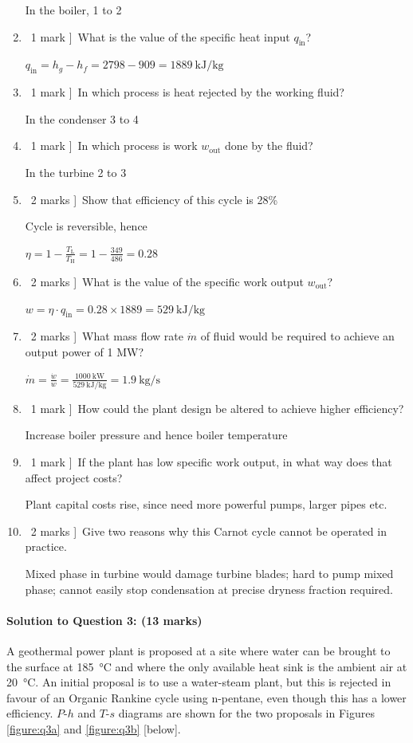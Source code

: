 \documentclass[a4paper,12pt,fleqn]{article}
\begin{document}
\begin{enumerate}[label=\alph*)]
In the boiler, 1 to 2
\item \lbrack\ 1 mark ]\ What is the value of the specific heat input $q_\mathrm{in}$?\par
$q_\mathrm{in}=h_g-h_f = 2798 - 909 = \SI{1889}{\kilo\joule\per\kg}$
\item \lbrack\ 1 mark ]\ In which process is heat rejected by the working fluid?\par
In the condenser 3 to 4
\item \lbrack\ 1 mark ]\ In which process is work $w_\mathrm{out}$ done by the fluid?\par
In the turbine 2 to 3
\item \lbrack\ 2 marks ]\ Show that efficiency of this cycle is 28\%\par
Cycle is reversible, hence\par $\eta=1-\frac{T_\mathrm{L}}{T_\mathrm{H}}=1-\frac{349}{486}=0.28$
\item \lbrack\ 2 marks ]\ What is the value of the specific work output $w_\mathrm{out}$?\par
$w=\eta\cdot q_\mathrm{in}=0.28\times 1889 = \SI{529}{\kilo\joule\per\kg}$
\item \lbrack\ 2 marks ]\ What mass flow rate $\dot m$ of fluid would be required to achieve an output power of 1 MW?\par
$\dot m =\frac{\dot w}{w}=\frac{\SI{1000}{\kilo\watt}}{\SI{529}{\kilo\joule\per\kg}}=\SI{1.9}{\kg\per\second}$
\item \lbrack\ 1 mark ]\ How could the plant design be altered to achieve higher efficiency?\par
Increase boiler pressure and hence boiler temperature
\item \lbrack\ 1 mark ]\ If the plant has low specific work output, in what way does that affect project costs?\par
Plant capital costs rise, since need more powerful pumps, larger pipes etc.
\item \lbrack\ 2 marks ]\ Give two reasons why this Carnot cycle cannot be operated in practice.\par
Mixed phase in turbine would damage turbine blades; hard to pump mixed phase; cannot easily stop condensation at precise dryness fraction required.
\end{enumerate}

\paragraph{\textbf{Solution to Question 3: (13 marks)}}
A geothermal power plant is proposed at a site where water can be brought to the surface at \SI{185}{\celsius} and where the only available heat sink is the ambient air at \SI{20}{\celsius}. An initial proposal is to use a water-steam plant, but this is rejected in favour of an Organic Rankine cycle using n-pentane, even though this has a lower efficiency.
$P$-$h$ and $T$-$s$ diagrams are shown for the two proposals in Figures \ref{figure:q3a} and \ref{figure:q3b} [below].
\end{document}
